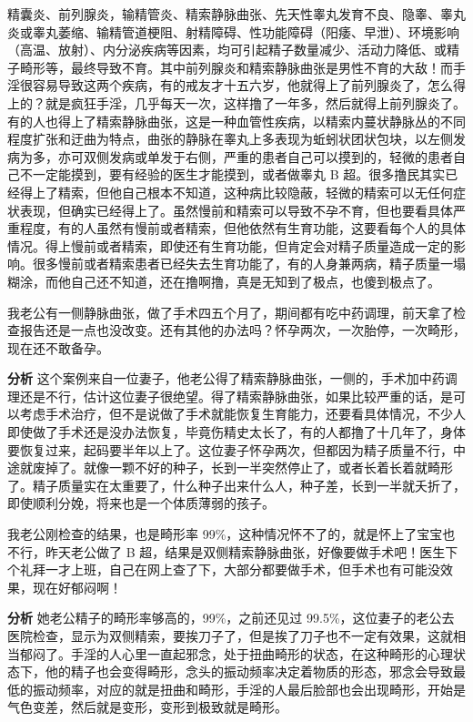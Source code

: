 精囊炎、前列腺炎，输精管炎、精索静脉曲张、先天性睾丸发育不良、隐睾、睾丸炎或睾丸萎缩、输精管道梗阻、射精障碍、性功能障碍（阳痿、早泄）、环境影响（高温、放射）、内分泌疾病等因素，均可引起精子数量减少、活动力降低、或精子畸形等，最终导致不育。其中前列腺炎和精索静脉曲张是男性不育的大敌！而手淫很容易导致这两个疾病，有的戒友才十五六岁，他就得上了前列腺炎了，怎么得上的？就是疯狂手淫，几乎每天一次，这样撸了一年多，然后就得上前列腺炎了。有的人也得上了精索静脉曲张，这是一种血管性疾病，以精索内蔓状静脉丛的不同程度扩张和迂曲为特点，曲张的静脉在睾丸上多表现为蚯蚓状团状包块，以左侧发病为多，亦可双侧发病或单发于右侧，严重的患者自己可以摸到的，轻微的患者自己不一定能摸到，要有经验的医生才能摸到，或者做睾丸 B 超。很多撸民其实已经得上了精索，但他自己根本不知道，这种病比较隐蔽，轻微的精索可以无任何症状表现，但确实已经得上了。虽然慢前和精索可以导致不孕不育，但也要看具体严重程度，有的人虽然有慢前或者精索，但他依然有生育功能，这要看每个人的具体情况。得上慢前或者精索，即使还有生育功能，但肯定会对精子质量造成一定的影响。很多慢前或者精索患者已经失去生育功能了，有的人身兼两病，精子质量一塌糊涂，而他自己还不知道，还在撸啊撸，真是无知到了极点，也傻到极点了。

\begin{case}[不孕不育]
    我老公有一侧静脉曲张，做了手术四五个月了，期间都有吃中药调理，前天拿了检查报告还是一点也没改变。还有其他的办法吗？怀孕两次，一次胎停，一次畸形，现在还不敢备孕。

    \textbf{分析} 这个案例来自一位妻子，他老公得了精索静脉曲张，一侧的，手术加中药调理还是不行，估计这位妻子很绝望。得了精索静脉曲张，如果比较严重的话，是可以考虑手术治疗，但不是说做了手术就能恢复生育能力，还要看具体情况，不少人即使做了手术还是没办法恢复，毕竟伤精史太长了，有的人都撸了十几年了，身体要恢复过来，起码要半年以上了。这位妻子怀孕两次，但都因为精子质量不行，中途就废掉了。就像一颗不好的种子，长到一半突然停止了，或者长着长着就畸形了。精子质量实在太重要了，什么种子出来什么人，种子差，长到一半就夭折了，即使顺利分娩，将来也是一个体质薄弱的孩子。
\end{case}

\begin{case}[不孕不育]
    我老公刚检查的结果，也是畸形率 99\%，这种情况怀不了的，就是怀上了宝宝也不行，昨天老公做了 B 超，结果是双侧精索静脉曲张，好像要做手术吧！医生下个礼拜一才上班，自己在网上查了下，大部分都要做手术，但手术也有可能没效果，现在好郁闷啊！

    \textbf{分析} 她老公精子的畸形率够高的，99\%，之前还见过 99.5\%，这位妻子的老公去医院检查，显示为双侧精索，要挨刀子了，但是挨了刀子也不一定有效果，这就相当郁闷了。手淫的人心里一直起邪念，处于扭曲畸形的状态，在这种畸形的心理状态下，他的精子也会变得畸形，念头的振动频率决定着物质的形态，邪念会导致最低的振动频率，对应的就是扭曲和畸形，手淫的人最后脸部也会出现畸形，开始是气色变差，然后就是变形，变形到极致就是畸形。
\end{case}

